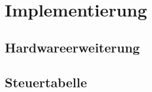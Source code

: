 \chapter{Implementierung}
\label{chapter:Dokumentation-Implementierung}

\section{Hardwareerweiterung}
\label{section:Dokumentation-Implementierung-Hardwareerweiterung}

\section{Steuertabelle}
\label{section:Dokumentation-Implementierung-Steuertabelle}
